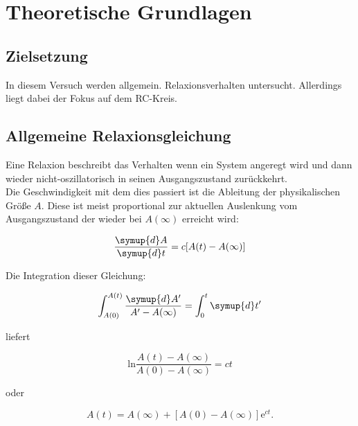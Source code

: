 \section{Theoretische Grundlagen}

    \subsection{Zielsetzung}

        \noindent In diesem Versuch werden allgemein. Relaxionsverhalten untersucht. Allerdings liegt dabei der Fokus auf dem RC-Kreis.

    \subsection{Allgemeine Relaxionsgleichung}

        \noindent Eine Relaxion beschreibt das Verhalten wenn ein System angeregt wird und dann wieder nicht-oszillatorisch in seinen 
        Ausgangszustand zurückkehrt.\\ Die Geschwindigkeit mit dem dies passiert ist die Ableitung der physikalischen Größe $A$. Diese ist meist 
        proportional zur aktuellen Auslenkung vom Ausgangszustand der wieder bei $A(\infty)$ erreicht wird:

        \begin{equation}
            \frac{\symup{d}A}{\symup{d}t}=c[A(t)-A(\infty)]
            \label{eqn:1}
        \end{equation}

        \noindent Die Integration dieser Gleichung:

        \begin{equation*}
            \int_{A(0)}^{A(t)} \frac{\symup{d}A'}{A' - A(\infty)} = \int_0^t \symup{d}t'
        \end{equation*}

        \noindent liefert

        \begin{equation*}
            \text{ln} \frac{A(t) - A(\infty)}{A(0) - A(\infty)} = ct
        \end{equation*}

        \noindent oder

        \begin{equation}
            A(t) = A(\infty) + [A(0) - A(\infty)] \text{e}^{ct} . 
            \label{eqn:2}
        \end{equation}

